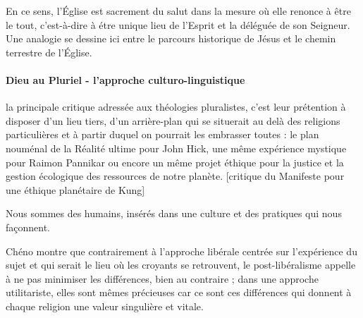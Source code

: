 \begin{singlequote}
En ce sens, l'Église est sacrement du salut dans la mesure où elle renonce à être le tout, c'est-à-dire à étre unique lieu de l'Esprit et la déléguée de son Seigneur. Une analogie se dessine ici entre le parcours historique de Jésus et le chemin terrestre de l'Église.    \cite[p. 241]{duquoc_unique_2002}
\end{singlequote}




\paragraph{Dieu au Pluriel -  l'approche culturo-linguistique}    
        \cite{cheno_dieu_2017}

\begin{singlequote}
        
        la principale critique adressée aux théologies pluralistes, c’est leur prétention à disposer d’un lieu tiers, d’un arrière-plan qui se situerait au delà des religions particulières et à partir duquel on pourrait les embrasser toutes : le plan nouménal de la Réalité ultime pour John Hick, une même expérience mystique pour Raimon Pannikar ou encore un même projet éthique pour la justice et la gestion écologique des ressources de notre planète. [critique du Manifeste pour une éthique planétaire de Kung]  \cite[p. 111]{cheno_dieu_2017}
\end{singlequote}

        
\begin{singlequote}
        Nous sommes des humains, insérés dans une culture et des pratiques qui nous façonnent. \cite[p. x]{cheno_dieu_2017}

\end{singlequote}


\begin{singlequote}
    Chéno montre que contrairement à l’approche libérale centrée sur l’expérience du sujet et qui serait le lieu où les croyants se retrouvent, le post-libéralisme appelle à ne pas minimiser les différences, bien au contraire ; dans une approche utilitariste, elles sont mêmes précieuses car ce sont ces différences qui donnent à chaque religion une valeur singulière et vitale.  \cite{pisani_cheno_2018}
\end{singlequote}


